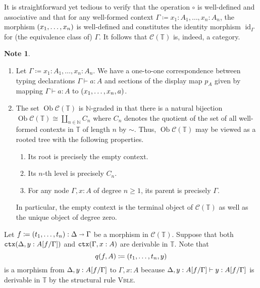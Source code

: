 \documentclass[10pt,letterpaper,cm]{nupset}
\theoremstyle{definition}
\newtheorem{note}[definition]{Note}
\theoremstyle{theorem}
\theoremstyle{remark}
\newcommand{\sra}{\shortrightarrow}
\DeclareMathOperator{\ob}{Ob}
\newcommand{\0}{\mathbf{0}}
\newcommand{\1}{\mathbf{1}}
\newcommand{\2}{\mathbf{2}}
\DeclareMathOperator{\ctx}{\mathtt{ctx}}
\renewcommand{\c}{\mathscr{C}}
\newcommand{\N}{\mathbb N}
\newcommand{\T}{\mathbb T}
\DeclareMathOperator{\idd}{id}
\newcommand{\be}{\begin{enumerate}}
\newcommand{\ee}{\end{enumerate}}
\begin{document}
It is straightforward yet tedious to verify that the operation $\circ$ is well-defined and associative and that for any well-formed context $\Gamma \coloneqq {x_1 :A_1, \ldots, x_n :A_n}$, the morphism $\mleft(x_1, \ldots, x_n\mright)$ is well-defined and constitutes the identity morphism $\idd_{\Gamma}$ for (the equivalence class of) $\Gamma$. It follows that $\c(\T)$ is, indeed, a category. 

\begin{note}\label{terms} $ $
\be[label=(\arabic*)]
\item Let $\Gamma \coloneqq x_1:A_1, \ldots, x_n:A_n$. We have a one-to-one correspondence between typing declarations $\Gamma \vdash a : A$ and sections of the display map $p_A$ given by mapping $\Gamma \vdash a : A$ to $\mleft(x_1, \ldots, x_n, a\mright)$.
\item  The set $\ob{\c(\T)}$ is $\N$-graded in that there is a natural bijection $\ob{\c(\T)} \cong \coprod_{n\in \N}C_n$ where $C_n$ denotes the quotient of the set of all well-formed contexts in $\T$ of length $n$ by $\sim$. Thus, $\ob{\c(\T)}$ may be viewed as a rooted tree with the following properties.  
\be
\item Its root is precisely the empty context.
\item Its $n$-th level is precisely $C_n$.
\item For any node $\Gamma, x:A$ of degree $n\geq 1$, its parent is precisely $\Gamma$. 
\ee
In particular, the empty context is the terminal object of $\c(\T)$ as well as the unique object of degree zero.
\ee
\end{note}


\medskip

Let $f \coloneqq \mleft(t_1, \ldots, t_n\mright) : \Delta \sra \Gamma$ be a morphism in $\c(\T)$. Suppose that both $\ctx\mleft(\Delta, y : A\mleft[f/\Gamma\mright]\mright)$ and $\ctx\mleft(\Gamma, x :A\mright)$ are derivable in $\T$. Note that $$q(f,A) \coloneqq \mleft(t_1, \ldots, t_n, y\mright)$$ is a morphism from $\Delta, y : A\mleft[f/\Gamma\mright]$ to $\Gamma, x :A$ because $\Delta, y : A\mleft[f/\Gamma\mright] \vdash y : A\mleft[f/\Gamma\mright]$ is derivable in $\T$ by the structural rule  \textsc{Vble}.
\end{document}
